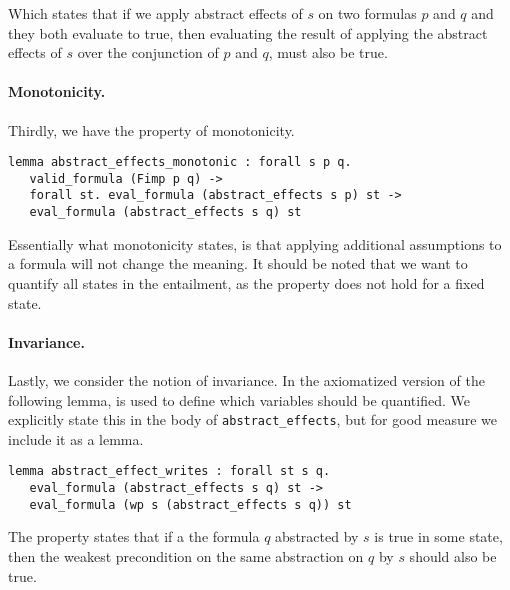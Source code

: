 Which states that if we apply abstract effects of $s$ on two formulas $p$ and $q$ and they both evaluate to true,
then evaluating the result of applying the abstract effects of $s$ over the conjunction of $p$ and $q$, must also be true.

\paragraph{Monotonicity.}
Thirdly, we have the property of monotonicity.

\begin{lstlisting}
lemma abstract_effects_monotonic : forall s p q.
   valid_formula (Fimp p q) ->
   forall st. eval_formula (abstract_effects s p) st ->
   eval_formula (abstract_effects s q) st
 \end{lstlisting}

Essentially what monotonicity states, is that applying additional assumptions to a formula will not change the meaning. It should be noted that we want to quantify all states in the entailment, as the property does not hold for a fixed state.

\paragraph{Invariance.}
Lastly, we consider the notion of invariance.
In \cite{wp-revisited} the axiomatized version of the following lemma, is used to define which variables should be quantified.
We explicitly state this in the body of \texttt{abstract\_effects},
but for good measure we include it as a lemma.

\begin{lstlisting}
lemma abstract_effect_writes : forall st s q.
   eval_formula (abstract_effects s q) st ->
   eval_formula (wp s (abstract_effects s q)) st
 \end{lstlisting}

 The property states that if a the formula $q$ abstracted by $s$ is true in some state,
 then the weakest precondition on the same abstraction on $q$ by $s$ should also be true.


